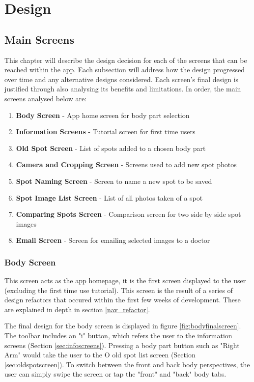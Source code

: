 \chapter{Design}
\section{Main Screens}
This chapter will describe the design decision for each of the screens that can be reached within the app. Each subsection will address how the design progressed over time and any alternative designs considered. Each screen's final design is justified through also analysing its benefits and limitations. In order, the main screens analysed below are:
\begin{enumerate}
    \item \textbf{Body Screen} - App home screen for body part selection 
    \item \textbf{Information Screens} - Tutorial screen for first time users
    \item \textbf{Old Spot Screen} - List of spots added to a chosen body part
    \item \textbf{Camera and Cropping Screen} - Screens used to add new spot photos
    \item \textbf{Spot Naming Screen} - Screen to name a new spot to be saved
    \item \textbf{Spot Image List Screen} - List of all photos taken of a spot
    \item \textbf{Comparing Spots Screen} - Comparison screen for two side by side spot images
    \item \textbf{Email Screen} - Screen for emailing selected images to a doctor
    
\end{enumerate}

\subsection{Body Screen}
This screen acts as the app homepage, it is the first screen displayed to the user (excluding the first time use tutorial). This screen is the result of a series of design refactors that occured within the first few weeks of development. These are explained in depth in section \ref{nav_refactor}. 

The final design for the body screen is displayed in figure \ref{fig:bodyfinalscreen}. The toolbar includes an "i" button, which refers the user to the information screens (Section \ref{sec:infoscreens}). Pressing a body part button such as "Right Arm" would take the user to the O
old spot list screen (Section \ref{sec:oldspotscreen}). To switch between the front and back body perspectives, the user can simply swipe the screen or tap the "front" and "back" body tabs.

